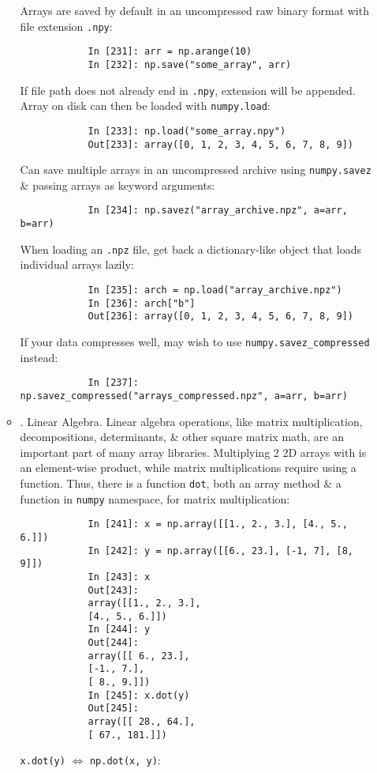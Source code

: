 \documentclass{article}
\begin{document}
\begin{itemize}
\begin{itemize}
		 Arrays are saved by default in an uncompressed raw binary format with file extension {\tt.npy}:
		\begin{verbatim}
			In [231]: arr = np.arange(10)
			In [232]: np.save("some_array", arr)
		\end{verbatim}
		If file path does not already end in {\tt.npy}, extension will be appended. Array on disk can then be loaded with {\tt numpy.load}:
		\begin{verbatim}
			In [233]: np.load("some_array.npy")
			Out[233]: array([0, 1, 2, 3, 4, 5, 6, 7, 8, 9])
		\end{verbatim}
		Can save multiple arrays in an uncompressed archive using {\tt numpy.savez} \& passing arrays as keyword arguments:
		\begin{verbatim}
			In [234]: np.savez("array_archive.npz", a=arr, b=arr)
		\end{verbatim}
		When loading an {\tt.npz} file, get back a dictionary-like object that loads individual arrays lazily:
		\begin{verbatim}
			In [235]: arch = np.load("array_archive.npz")
			In [236]: arch["b"]
			Out[236]: array([0, 1, 2, 3, 4, 5, 6, 7, 8, 9])
		\end{verbatim}
		If your data compresses well, may wish to use \verb|numpy.savez_compressed| instead:
		\begin{verbatim}
			In [237]: np.savez_compressed("arrays_compressed.npz", a=arr, b=arr)
		\end{verbatim}
		\item {. Linear Algebra.} Linear algebra operations, like matrix multiplication, decompositions, determinants, \& other square matrix math, are an important part of many array libraries. Multiplying 2 2D arrays with {\tt*} is an element-wise product, while matrix multiplications require using a function. Thus, there is a function {\tt dot}, both an array method \& a function in {\tt numpy} namespace, for matrix multiplication:
		\begin{verbatim}
			In [241]: x = np.array([[1., 2., 3.], [4., 5., 6.]])
			In [242]: y = np.array([[6., 23.], [-1, 7], [8, 9]])
			In [243]: x
			Out[243]:
			array([[1., 2., 3.],
			[4., 5., 6.]])
			In [244]: y
			Out[244]:
			array([[ 6., 23.],
			[-1., 7.],
			[ 8., 9.]])
			In [245]: x.dot(y)
			Out[245]:
			array([[ 28., 64.],
			[ 67., 181.]])
		\end{verbatim}
		{\tt x.dot(y)} $\Leftrightarrow$ {\tt np.dot(x, y)}:

\end{itemize}
\end{itemize}
\end{document}
